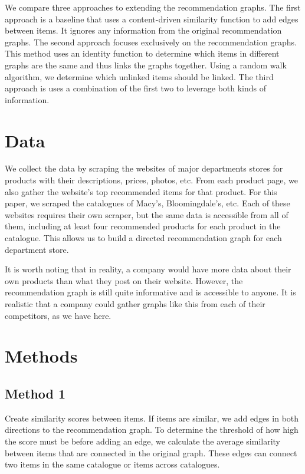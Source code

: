 \documentclass[10pt]{article}
\begin{document}
We compare three approaches to extending the recommendation graphs. The first
approach is a baseline that uses a content-driven similarity function to add
edges between items. It ignores any information from the original
recommendation graphs. The second approach focuses exclusively on the
recommendation graphs. This method uses an identity function to determine which
items in different graphs are the same and thus links the graphs together.
Using a random walk algorithm, we determine which unlinked items should be
linked. The third approach is uses a combination of the first two to leverage
both kinds of information.

\section*{Data}
We collect the data by scraping the websites of major departments stores for
products with their descriptions, prices, photos, etc. From each product page,
we also gather the website's top recommended items for that product.  For this
paper, we scraped the catalogues of Macy's, Bloomingdale's, etc.  Each of these
websites requires their own scraper, but the same data is accessible from all
of them, including at least four recommended products for each product in the
catalogue. This allows us to build a directed recommendation graph for each
department store. 

It is worth noting that in reality, a company would have more data about their
own products than what they post on their website. However, the recommendation
graph is still quite informative and is accessible to anyone.  It is realistic
that a company could gather graphs like this from each of their competitors, as
we have here.

\section*{Methods}
\subsection*{Method 1}
Create similarity scores between items. If items are similar, we add edges in
both directions to the recommendation graph. To determine the threshold of how
high the score must be before adding an edge, we calculate the average
similarity between items that are connected in the original graph.  These edges
can connect two items in the same catalogue or items across catalogues.
\end{document}
